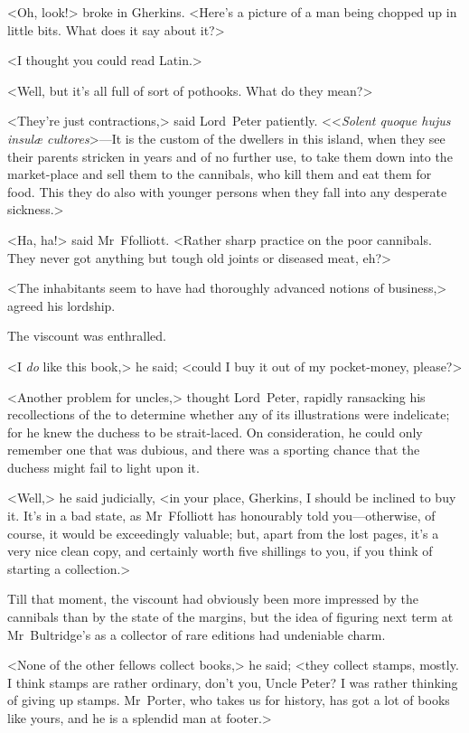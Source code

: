 <Oh, look!> broke in Gherkins. <Here's a picture of a man being chopped up in little bits. What does it say about it?>

<I thought you could read Latin.>

<Well, but it's all full of sort of pothooks. What do they mean?>

<They're just contractions,> said Lord~Peter patiently. <<\textit{Solent quoque hujus insulæ cultores}>—It is the custom of the dwellers in this island, when they see their parents stricken in years and of no further use, to take them down into the market-place and sell them to the cannibals, who kill them and eat them for food. This they do also with younger persons when they fall into any desperate sickness.>

<Ha, ha!> said Mr~Ffolliott. <Rather sharp practice on the poor cannibals. They never got anything but tough old joints or diseased meat, eh?>

<The inhabitants seem to have had thoroughly advanced notions of business,> agreed his lordship.

The viscount was enthralled.

<I \emph{do} like this book,> he said; <could I buy it out of my pocket-money, please?>

<Another problem for uncles,> thought Lord~Peter, rapidly ransacking his recollections of the  to determine whether any of its illustrations were indelicate; for he knew the duchess to be strait-laced. On consideration, he could only remember one that was dubious, and there was a sporting chance that the duchess might fail to light upon it.

<Well,> he said judicially, <in your place, Gherkins, I should be inclined to buy it. It's in a bad state, as Mr~Ffolliott has honourably told you—otherwise, of course, it would be exceedingly valuable; but, apart from the lost pages, it's a very nice clean copy, and certainly worth five shillings to you, if you think of starting a collection.>

Till that moment, the viscount had obviously been more impressed by the cannibals than by the state of the margins, but the idea of figuring next term at Mr~Bultridge's as a collector of rare editions had undeniable charm.

<None of the other fellows collect books,> he said; <they collect stamps, mostly. I think stamps are rather ordinary, don't you, Uncle Peter? I was rather thinking of giving up stamps. Mr~Porter, who takes us for history, has got a lot of books like yours, and he is a splendid man at footer.>

